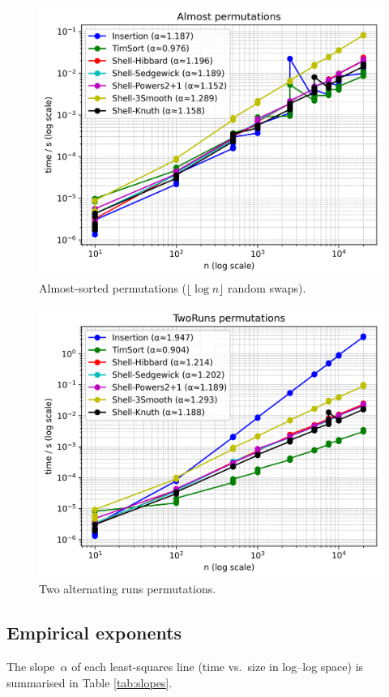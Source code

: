 \documentclass[11pt]{article}
\begin{document}
\begin{figure}[ht]
  \centering
  \includegraphics[width=\linewidth]{../results/almost_plot.png}
  \caption{Almost-sorted permutations ($\lfloor\log n\rfloor$ random swaps).}
  \label{fig:almost}
\end{figure}

\begin{figure}[ht]
  \centering
  \includegraphics[width=\linewidth]{../results/tworuns_plot.png}
  \caption{Two alternating runs permutations.}
  \label{fig:tworuns}
\end{figure}

\subsection{Empirical exponents}
The slope~$\alpha$ of each least-squares line (time vs.~size in
log–log space) is summarised in Table \ref{tab:slopes}.
\end{document}
